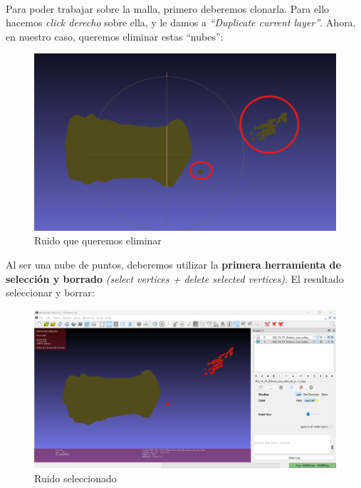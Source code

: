 \documentclass{article}
\begin{document}
~\\

Para poder trabajar sobre la malla, primero deberemos clonarla. Para ello hacemos \textit{click derecho} sobre ella, y le damos a \textit{``Duplicate current layer''}. Ahora, en nuestro caso, queremos eliminar estas ``nubes'':

\begin{figure}[H]
    \centering
    \includegraphics[scale=0.45]{images/ruido_02.png}
    \caption{Ruido que queremos eliminar}
\end{figure}

\pagebreak

Al ser una nube de puntos, deberemos utilizar la \textbf{primera herramienta de selección y borrado} \textit{(select vertices + delete selected vertices)}. El resultado seleccionar y borrar:

\begin{figure}[H]
    \centering
    \includegraphics[scale=0.34]{images/ruido_03.png}
    \caption{Ruido seleccionado}
\end{figure}
\end{document}
